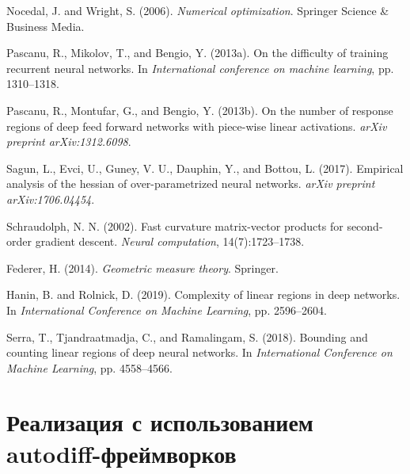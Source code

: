 \documentclass[11pt]{article}
\begin{document}
\begin{thebibliography}{10}
  Nocedal, J. and Wright, S. (2006).
  \newblock \textit{Numerical optimization}.
  \newblock Springer Science \& Business Media.

  Pascanu, R., Mikolov, T., and Bengio, Y. (2013a).
  \newblock On the difficulty of training recurrent neural networks.
  \newblock In \textit{International conference on machine learning}, pp. 1310--1318.

  Pascanu, R., Montufar, G., and Bengio, Y. (2013b).
  \newblock On the number of response regions of deep feed forward networks with piece-wise linear activations.
  \newblock \textit{arXiv preprint arXiv:1312.6098}.

  Sagun, L., Evci, U., Guney, V. U., Dauphin, Y., and Bottou, L. (2017).
  \newblock Empirical analysis of the hessian of over-parametrized neural networks.
  \newblock \textit{arXiv preprint arXiv:1706.04454}.

  Schraudolph, N. N. (2002).
  \newblock Fast curvature matrix-vector products for second-order gradient descent.
  \newblock \textit{Neural computation}, 14(7):1723--1738.

  Federer, H. (2014).
  \newblock \textit{Geometric measure theory}.
  \newblock Springer.

  Hanin, B. and Rolnick, D. (2019).
  \newblock Complexity of linear regions in deep networks.
  \newblock In \textit{International Conference on Machine Learning}, pp. 2596--2604.

  Serra, T., Tjandraatmadja, C., and Ramalingam, S. (2018).
  \newblock Bounding and counting linear regions of deep neural networks.
  \newblock In \textit{International Conference on Machine Learning}, pp. 4558--4566.
\end{thebibliography}

\appendix
\section{Реализация с использованием autodiff-фреймворков}
\end{document}
